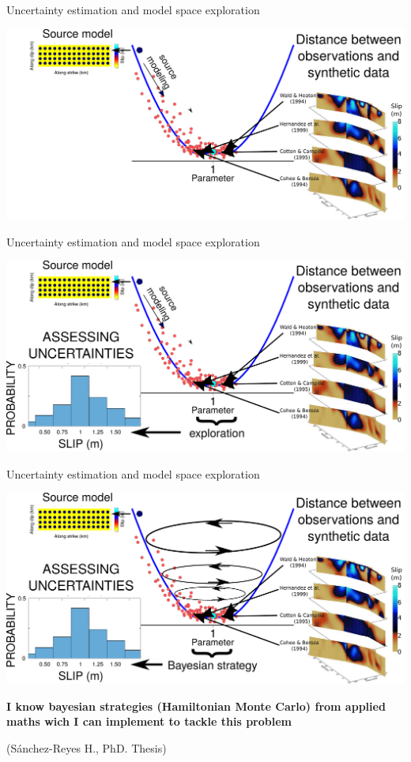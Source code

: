 \documentclass{beamer}
\begin{document}
\begin{frame}
 {Uncertainty estimation and model space exploration}

 \includegraphics[width=1\linewidth]{images/uncertainty_2.pdf}
 \addtocounter{framenumber}{-1}
 
\end{frame}


\begin{frame}
 {Uncertainty estimation and model space exploration}

 \vskip 0cm
 \includegraphics[width=1\linewidth]{images/uncertainty_3.pdf}
 \addtocounter{framenumber}{-1}
 
\end{frame}

\begin{frame}
 {Uncertainty estimation and model space exploration}

 \vskip -0cm
 \includegraphics[width=1\linewidth]{images/uncertainty_4.pdf}
 \begin{center}
 {\bf I know bayesian strategies (Hamiltonian Monte Carlo) from applied maths wich I can implement to tackle this problem}
 \end{center}
 \hfill (S\'anchez-Reyes H., PhD. Thesis)
 \addtocounter{framenumber}{-1}
 
\end{frame}
\end{document}
